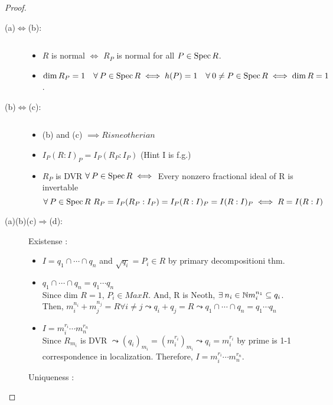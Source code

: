 \begin{theorem}
  \begin{proof} \mbox{}
    \begin{description}
      \item[\rm (a)$\Leftrightarrow$(b):] $ $
        \begin{itemize}
          \item $R$ is normal $\iff$ $R_P$ is normal for all $P \in \operatorname{Spec} R$.
          \item $\dim R_P = 1 \quad \forall P \in \Spec R \iff h(P) = 1 \quad
            \forall 0 \ne P \in \Spec R \iff \dim R = 1$.
        \end{itemize}
      \item[\rm (b)$\Leftrightarrow$(c):] $ $
        \begin{itemize}
          \item (b) and (c) $\implies R is neotherian$
          \item $I_P(R:I)_P = I_P(R_P:I_P)$ (Hint I is f.g.)
          \item $R_P$ is DVR $\forall P \in \Spec R \iff$ Every nonzero fractional
            ideal of R is invertable
            $$
            \forall P \in \Spec R\ R_P = I_P(R_P:I_P) = I_P(R:I)_P
             = I(R:I)_P \iff R = I(R:I)
            $$
        \end{itemize}
      \item[\rm (a)(b)(c)$\Rightarrow$(d):] $ $ \\
        Existense :
        \begin{itemize} 
          \item $I = q_1 \cap \cdots \cap q_n$ and $\sqrt{q_i} = P_i \in R $ by
             primary decompositioni thm.
          \item $q_1 \cap \cdots \cap q_n = q_1 \cdots q_n$ \\
            Since dim $R = 1$, $P_i \in Max R$. And, R is Neoth, $\exists n_i \in \Nb
            m_i^{n_1} \subseteq q_i$. Then, $m_i^{n_i} + m_j^{n_j} = R \forall i \neq
            j \leadsto q_i + q_j  = R \leadsto q_1 \cap \cdots \cap q_n = q_1 \cdots
             q_n$
           \item $I = m_i^{r_i} \cdots m_n^{r_n}$ \\
             Since $R_{m_i}$ is DVR $\leadsto (q_i)_{m_i} = (m_i^{r_i})_{m_i} \leadsto
              q_i = m_i^{r_i}$ by prime is 1-1 correspondence in localization. 
              Therefore,  $I = m_i^{r_i} \cdots m_n^{r_n}$. 
        \end{itemize}
        Uniqueness : 
        \begin{itemize}

\end{itemize}
\end{description}
\end{proof}
\end{theorem}

